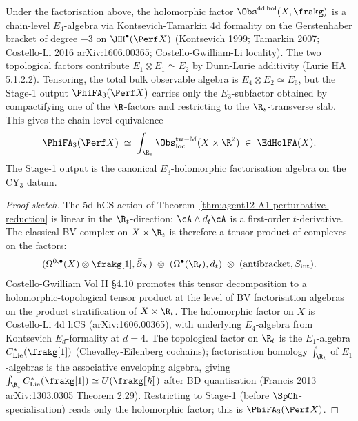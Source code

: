\begin{theorem}
\label{thm:agent12-A2-E3-chain-level}
Under the factorisation above, the holomorphic factor
$\Obs^{4\mathrm{d\,hol}}(X, \frakg)$ is a chain-level
$E_4$-algebra via Kontsevich-Tamarkin 4d formality on the Gerstenhaber
bracket of degree $-3$ on $\HH^\bullet(\Perf X)$
(Kontsevich 1999; Tamarkin 2007; Costello-Li 2016 arXiv:1606.00365;
Costello-Gwilliam-Li locality). The two topological factors contribute
$E_1 \otimes E_1 \simeq E_2$ by Dunn-Lurie additivity (Lurie HA 5.1.2.2).
Tensoring, the total bulk observable algebra is
$E_4 \otimes E_2 \simeq E_6$, but the Stage-1 output
$\PhiFA_3(\Perf X)$ carries only the $E_3$-subfactor obtained by
compactifying one of the $\R$-factors and restricting to the
$\R_s$-transverse slab. This gives the chain-level equivalence
\[
 \PhiFA_3(\Perf X)
 \;\simeq\;
 \int_{\R_s} \Obs^{\mathrm{tw-M}}_{\mathrm{loc}}(X \times \R^2)
 \;\in\;
 \EdHolFA(X).
\]
The Stage-1 output is the canonical $E_3$-holomorphic factorisation
algebra on the CY$_3$ datum.
\end{theorem}

\begin{proof}[Proof sketch]
The 5d hCS action of Theorem~\ref{thm:agent12-A1-perturbative-reduction}
is linear in the $\R_t$-direction: $\cA \wedge d_t \cA$ is a first-order
$t$-derivative. The classical BV complex on $X \times \R_t$ is therefore
a tensor product of complexes on the factors:
\[
 (\Omega^{0,\bullet}(X) \otimes \frakg[1], \bar\partial_X)
 \;\otimes\;
 (\Omega^\bullet(\R_t), d_t)
 \;\otimes\;
 (\text{antibracket}, S_{\mathrm{int}}).
\]
Costello-Gwilliam Vol II \S4.10 promotes this tensor decomposition to a
holomorphic-topological tensor product at the level of BV
factorisation algebras on the product stratification of $X \times \R_t$.
The holomorphic factor on $X$ is Costello-Li 4d hCS
(arXiv:1606.00365), with underlying $E_4$-algebra from Kontsevich
$E_d$-formality at $d = 4$. The topological factor on $\R_t$ is the
$E_1$-algebra $C^*_{\mathrm{Lie}}(\frakg[1])$ (Chevalley-Eilenberg
cochains); factorisation homology $\int_{\R_t}$ of $E_1$-algebras is the
associative enveloping algebra, giving
$\int_{\R_t} C^*_{\mathrm{Lie}}(\frakg[1]) \simeq U(\frakg[\![\hbar]\!])$
after BD quantisation (Francis 2013 arXiv:1303.0305 Theorem 2.29).
Restricting to Stage-1 (before $\SpCh$-specialisation) reads only the
holomorphic factor; this is $\PhiFA_3(\Perf X)$.
\end{proof}

